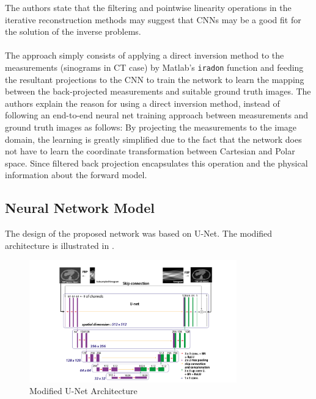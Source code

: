 \documentclass[journal, onecolumn, 11pt]{IEEEtran}
\begin{document}
The authors state that the filtering and pointwise linearity operations in the iterative reconstruction methods may suggest that CNNs may be a good fit for the solution of the inverse problems. 
\\
\\
The approach simply consists of applying a direct inversion method to the measurements (sinograms in CT case) by Matlab's \texttt{iradon} function and feeding the resultant projections to the CNN to train the network to learn the mapping between the back-projected measurements and suitable ground truth images. 
The authors explain the reason for using a direct inversion method, instead of following an end-to-end neural net training approach between measurements and ground truth images as follows: 
By projecting the measurements to the image domain, the learning is greatly simplified due to the fact that the network does not have to learn the coordinate transformation between Cartesian and Polar space. Since filtered back projection encapsulates this operation and the physical information about the forward model. 

\subsection{Neural Network Model}

The design of the proposed network was based on U-Net. The modified architecture is illustrated in .

\begin{figure}[h]
\centering
\includegraphics[width=0.8\textwidth]{images/unet.png}
\caption{Modified U-Net Architecture}\label{fig:Unet}
\end{figure}
\end{document}
